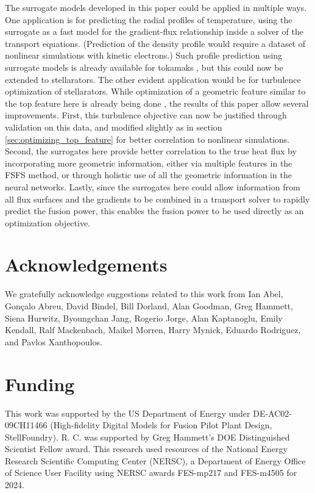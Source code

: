 \documentclass{jpp}
\newcommand{\changed}[1]{{#1}}
\begin{document}
The surrogate models developed in this paper could be applied in multiple ways.
One application is for predicting the radial profiles of temperature, using the surrogate as a fast model for the gradient-flux relationship inside a solver of the transport equations.
(Prediction of the density profile would require a dataset of nonlinear simulations with kinetic electrons.)
Such profile prediction using surrogate models is already available for tokamaks \citep{citrin2015real,meneghini2017self}, but this could now be extended to stellarators.
The other evident application would be for turbulence optimization of stellarators.
While optimization of a geometric feature similar to the top feature here is already being done \citep{goodman2024quasi}, the results of this paper allow several improvements.
First, this turbulence objective can now be justified through validation on this data, and modified slightly as in section \ref{sec:optimizing_top_feature} for better correlation to nonlinear simulations.
Second, the surrogates here provide better correlation to the true heat flux by incorporating more geometric information, either via multiple features in the FSFS method, or through holistic use of all the geometric information in the neural networks.
Lastly, since the surrogates here could allow information from all flux surfaces and the gradients to be combined in a transport solver to rapidly predict the fusion power, this enables the fusion power to be used directly as an optimization objective.




\section*{Acknowledgements}
We gratefully acknowledge suggestions related to this work from
Ian Abel,
Gonçalo Abreu,
David Bindel,
Bill Dorland,
Alan Goodman,
Greg Hammett,
Siena Hurwitz,
Byoungchan Jang,
Rogerio Jorge,
Alan Kaptanoglu,
Emily Kendall,
Ralf Mackenbach,
\changed{Maikel Morren,}
Harry Mynick,
Eduardo Rodriguez,
and
Pavlos Xanthopoulos.

\section*{Funding}
This work was supported by the US Department of Energy under DE-AC02-09CH11466 (High-fidelity Digital Models for Fusion Pilot Plant Design, StellFoundry).
R. C. was supported by Greg Hammett's DOE Distinguished Scientist Fellow award.
This research used resources of the National Energy Research Scientific Computing Center (NERSC), a Department of Energy Office of Science User Facility using NERSC awards FES-mp217 and FES-m4505 for 2024.
\end{document}
